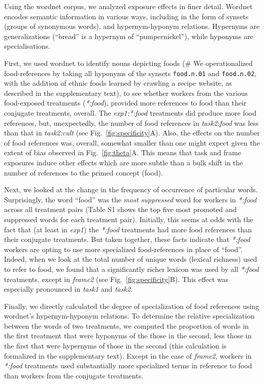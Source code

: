\documentclass[12pt]{article}
\begin{document}
Using the wordnet corpus, we analyzed exposure effects in finer detail.
Wordnet encodes semantic information in various ways, including in the form 
of synsets (groups of synonymous words), and hypernym-hyponym relations.
Hypernyms are generalizations (``bread'' is a hypernym of ``pumpernickel''),
while hyponyms are specialisations.

First, we used wordnet to identify nouns depicting foods (\# We 
operationalized food-references by taking all hyponyms of the synsets 
\texttt{food.n.01} and \texttt{food.n.02}, with the addition of ethnic foods 
learned by crawling a recipe website, as described in the supplementary text),
to see whether 
workers from the various food-exposed treatments (\textit{*:food}), 
provided more references to food than their conjugate treatments, overall.
The \textit{exp1:*:food} treatments
did produce more food references, but, unexpectedly, 
the number of food references in \textit{task2:food} was
less than that in \textit{task2:cult} (see Fig.~\ref{fig:specificity}A). Also, the effects on the
number of food references was, overall, somewhat smaller than one might 
expect given the extent of bias observed in Fig.~\ref{fig:theta}A.  This means that task and frame exposures
induce other effects which are more subtle than a bulk shift in the number 
of references to the primed concept (food).

Next, we looked at the change in the frequency of occurrence of particular 
words.  Surprisingly, the word ``food'' was the \textit{most suppressed} word
for workers in \textit{*:food} across all treatment pairs (Table S1 shows the
top five most promoted and suppressed words for each treatment pair).
Initially, this seems at odds with the fact that (at least in \textit{exp1})
the \textit{*:food} treatments had more food references than their conjugate
treatments.  But taken together, these facts indicate that \textit{*:food}
workers are opting 
to use more specialized food-references in place of ``food''.  
Indeed, when we look at the total number of unique
words (lexical richness) used to refer to food, we found that 
a significantly richer lexicon was used by all \textit{*:food} treatments,
except in \textit{frame2} (see Fig.~\ref{fig:specificity}B).  This effect 
was especially pronounced in \textit{task1} and 
\textit{task2}.

Finally, we directly calculated the degree of specialization of food 
references using wordnet's hypernym-hyponym relations.  To determine the 
relative specialization between the words of two treatments, we computed 
the proportion of words in the first treatment that were hyponyms of the 
those in the 
second, less those in the first that were hypernyms of those in the second 
(this calculation is formalized in the supplementary text).  Except in the
case of \textit{frame2}, workers in \textit{*:food} treatments used 
substantially more specialized terms in reference to food than workers 
from the conjugate treatments.
\end{document}
